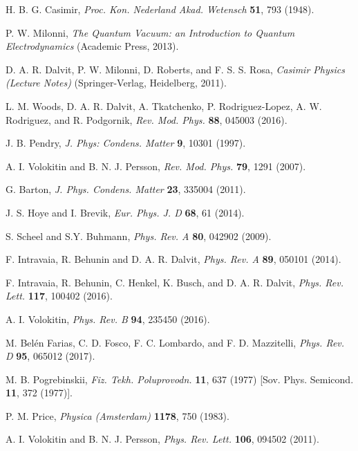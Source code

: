 \documentclass[10pt,aps,prl,superscriptaddress,showpacs,twocolumn]{revtex4-1}
\begin{document}
\begin{thebibliography}{1}

H. B. G. Casimir, 
\newblock \textit{Proc. Kon. Nederland Akad. Wetensch} {\bf 51}, 793 (1948).

P. W. Milonni, 
\newblock \textit{The Quantum Vacuum: an Introduction to Quantum Electrodynamics} (Academic Press, 2013).

D. A. R. Dalvit, P. W. Milonni, D. Roberts, and F. S. S. Rosa, 
{\it Casimir Physics (Lecture Notes)} (Springer-Verlag, Heidelberg, 2011).

L. M. Woods, D. A. R. Dalvit, A. Tkatchenko, P. Rodriguez-Lopez, A. W. Rodriguez, and R. Podgornik,
{\it Rev. Mod. Phys.} {\bf 88}, 045003 (2016).

J. B. Pendry, 
\textit{J. Phys: Condens. Matter} \textbf{9}, 10301 (1997).

A. I. Volokitin and B. N. J. Persson,
\textit{Rev. Mod. Phys.} \textbf{79}, 1291 (2007).

G. Barton,
{\it J. Phys. Condens. Matter} {\bf 23}, 335004 (2011).

J. S. Hoye and I. Brevik,
{\it Eur. Phys. J. D} {\bf 68}, 61 (2014).

S. Scheel and S.Y. Buhmann,
\newblock \textit{Phys. Rev. A} \textbf{80}, 042902 (2009).

F. Intravaia, R. Behunin and D. A. R. Dalvit,
\newblock \textit{Phys. Rev. A} \textbf{89}, 050101 (2014).

F. Intravaia, R. Behunin, C. Henkel, K. Busch, and D. A. R. Dalvit,
\newblock \textit{Phys. Rev. Lett.} \textbf{117}, 100402 (2016).

A. I. Volokitin,
{\it Phys. Rev. B} {\bf 94}, 235450 (2016).

M. Bel\'en Farias, C. D. Fosco, F. C. Lombardo, and F. D. Mazzitelli,
{\it Phys. Rev. D} {\bf 95}, 065012 (2017).

M. B. Pogrebinskii,
{\it Fiz. Tekh. Poluprovodn.} {\bf 11}, 637 (1977) [Sov. Phys. Semicond. {\bf 11}, 372 (1977)].

P. M. Price,
{\it Physica (Amsterdam)} {\bf 1178}, 750 (1983).

A. I. Volokitin and B. N. J. Persson,
\newblock \textit{Phys. Rev. Lett.} {\bf 106}, 094502 (2011).


\end{thebibliography}
\end{document}
